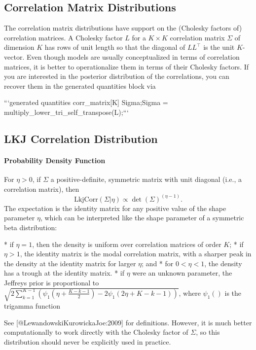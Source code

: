 \begin{description}
\chapter{Correlation Matrix Distributions}


The correlation matrix distributions have support on the (Cholesky factors of) correlation matrices.  A Cholesky factor $L$ for a $K \times K$ correlation matrix $\Sigma$ of dimension $K$ has rows of unit length so that the diagonal of $L L^{\top}$ is the unit $K$-vector. Even though models are usually conceptualized in terms of correlation matrices, it is better to operationalize them in terms of their Cholesky factors. If you are interested in the posterior distribution of the correlations, you can recover them in the generated quantities block via


```\n generated quantities {\n   corr_matrix[K] Sigma;\n   Sigma = multiply_lower_tri_self_transpose(L);\n }\n ```


\section{LKJ Correlation Distribution}\label{lkj-correlation.section}


\subsubsection{Probability Density Function}


For $\eta > 0$, if $\Sigma$ a positive-definite, symmetric matrix with unit diagonal (i.e., a correlation matrix), then \[ \text{LkjCorr}(\Sigma|\eta) \propto \det \left( \Sigma \right)^{(\eta - 1)}. \] The expectation is the identity matrix for any positive value of the shape parameter $\eta$, which can be interpreted like the shape parameter of a symmetric beta distribution:


*   if $\eta = 1$, then the density is uniform over correlation   matrices of order $K$; 
*   if $\eta > 1$, the identity matrix is the modal correlation   matrix, with a sharper peak in the density at the identity matrix   for larger $\eta$; and 
*   for $0 < \eta < 1$, the density has a trough at the identity   matrix. 
*   if $\eta$ were an unknown parameter, the Jeffreys prior is   proportional to $\sqrt{2\sum_{k=1}^{K-1}\left(   \psi_1\left(\eta+\frac{K-k-1}{2}\right) -   2\psi_1\left(2\eta+K-k-1 \right)\right)}$, where $\psi_1()$ is the   trigamma function


See [@LewandowskiKurowickaJoe:2009] for definitions. However, it is much better computationally to work directly with the Cholesky factor of $\Sigma$, so this distribution should never be explicitly used in practice.



\end{description}
